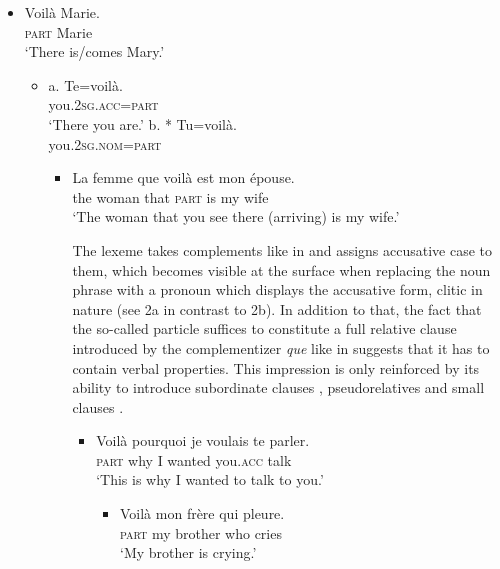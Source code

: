 \documentclass[output=paper]{langscibook}
\begin{document}
\begin{itemize}
\item \gll Voilà Marie.\\
     \textsc{part} Marie\\
\glt ‘There is/comes Mary.’
\z %

\begin{itemize}
\item \gll a.  Te=voilà.\\
     you.\textsc{2sg.acc}=\textsc{part}\\
\glt ‘There you are.’
\z %
\gll b. * Tu=voilà.\\
     you.\textsc{2sg.nom}=\textsc{part}\\
\begin{itemize}
\item \gll La femme que voilà est mon épouse.\\
     the woman that \textsc{part} is my wife \\
\glt ‘The woman that you see there (arriving) is my wife.’
\z %

The lexeme takes complements like in  and assigns accusative case to them, which becomes visible at the surface when replacing the noun phrase with a pronoun which displays the accusative form, clitic in nature (see 2a in contrast to 2b). In addition to that, the fact that the so-called particle suffices to constitute a full relative clause introduced by the complementizer \textit{que} like in  suggests that it has to contain verbal properties. This impression is only reinforced by its ability to introduce subordinate clauses , pseudorelatives  and small clauses . 

\begin{itemize}
\item \gll Voilà pourquoi je voulais te parler.\\
     \textsc{part} why I wanted you.\textsc{acc} talk\\
\glt ‘This is why I wanted to talk to you.’
\z %

\begin{itemize}
\item \gll Voilà mon frère qui pleure.\\
     \textsc{part} my brother who cries\\
\glt ‘My brother is crying.’
\z %


\end{itemize}
\end{itemize}
\end{itemize}
\end{itemize}
\end{itemize}
\end{document}
